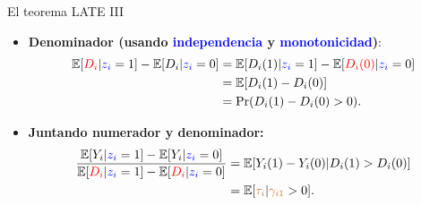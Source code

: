\documentclass[10pt, xcolor=dvipsnames]{beamer}
\begin{document}
\begin{frame}{El teorema LATE III}\label{ANEX:TEOR-LATE3}
\begin{itemize}
\item \textbf{Denominador (usando \textcolor{blue}{independencia} y \textcolor{blue}{monotonicidad})}:
    \begin{align}
    \begin{split}
        \operatorname{\mathbb{E}}[\textcolor{red}{D_i}|\textcolor{blue}{z_i} =1]  - \operatorname{\mathbb{E}}[D_i|\textcolor{blue}{z_i} =0] & = \operatorname{\mathbb{E}}[D_i(1)|\textcolor{blue}{z_i} =1]  - \operatorname{\mathbb{E}}[\textcolor{red}{D_i(0)}|\textcolor{blue}{z_i} =0] \\  &= \operatorname{\mathbb{E}}[D_i(1)-D_i(0)] \\ &= \Pr(D_i(1) - D_i(0) > 0).
    \end{split}
    \end{align}	
    \item \textbf{Juntando numerador y denominador:} 
    \begin{align}
    \begin{split}
        \frac{\operatorname{\mathbb{E}}[Y_i|\textcolor{blue}{z_i} =1] - \operatorname{\mathbb{E}}[Y_i|\textcolor{blue}{z_i} =0]}{\operatorname{\mathbb{E}}[\textcolor{red}{D_i}|\textcolor{blue}{z_i} =1] - \operatorname{\mathbb{E}}[\textcolor{red}{D_i}|\textcolor{blue}{z_i} =0]} &= \operatorname{\mathbb{E}}[Y_i(1)-Y_i(0)|D_i(1)>D_i(0)] \\
    &= \operatorname{\mathbb{E}}[\textcolor{brown}{\tau_i}|\textcolor{brown}{\gamma_{i1}}>0]. 	
    \end{split}	
    \end{align}	
\end{itemize}
\hyperlink{SLIDE:TEOR-LATE}{{}}
\end{frame}

\end{document}
